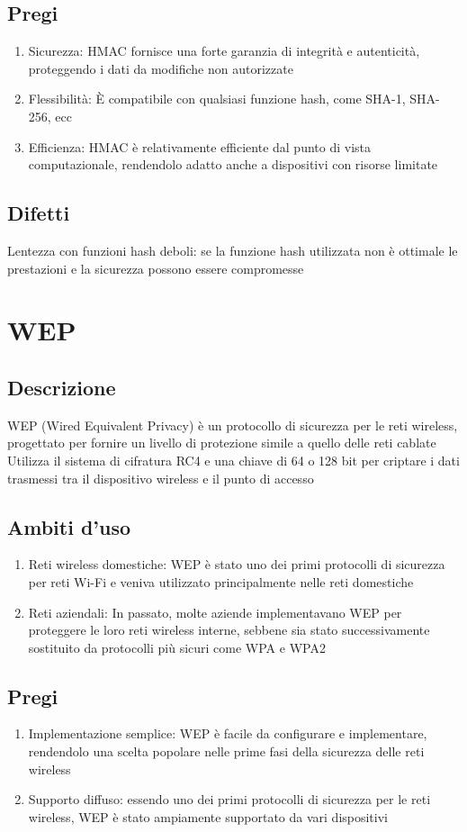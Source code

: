 \documentclass[10pt,oneside,a4paper]{article}
\begin{document}
\subsection{Pregi}
\begin{enumerate}
\item Sicurezza: HMAC fornisce una forte garanzia di integrità e autenticità, proteggendo i dati da modifiche non autorizzate
\item Flessibilità: È compatibile con qualsiasi funzione hash, come SHA-1, SHA-256, ecc
\item Efficienza: HMAC è relativamente efficiente dal punto di vista computazionale, rendendolo adatto anche a dispositivi con risorse limitate
\end{enumerate}
\subsection{Difetti}
Lentezza con funzioni hash deboli: se la funzione hash utilizzata non è ottimale le prestazioni e la sicurezza possono essere compromesse
\section{WEP}
\subsection{Descrizione}
WEP (Wired Equivalent Privacy) è un protocollo di sicurezza per le reti wireless, progettato per fornire un livello di protezione simile a quello delle reti cablate\\
Utilizza il sistema di cifratura RC4 e una chiave di 64 o 128 bit per criptare i dati trasmessi tra il dispositivo wireless e il punto di accesso
\subsection{Ambiti d'uso}
\begin{enumerate}
\item Reti wireless domestiche: WEP è stato uno dei primi protocolli di sicurezza per reti Wi-Fi e veniva utilizzato principalmente nelle reti domestiche
\item Reti aziendali: In passato, molte aziende implementavano WEP per proteggere le loro reti wireless interne, sebbene sia stato successivamente sostituito da protocolli più sicuri come WPA e WPA2
\end{enumerate}
\subsection{Pregi}
\begin{enumerate}
\item Implementazione semplice: WEP è facile da configurare e implementare, rendendolo una scelta popolare nelle prime fasi della sicurezza delle reti wireless
\item Supporto diffuso: essendo uno dei primi protocolli di sicurezza per le reti wireless, WEP è stato ampiamente supportato da vari dispositivi
\end{enumerate}
\end{document}
